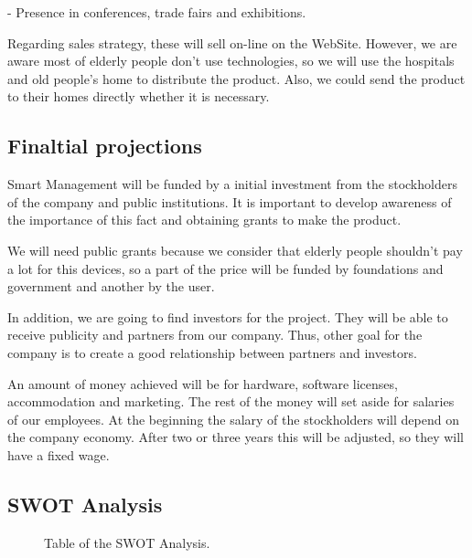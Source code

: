 -	Presence in conferences, trade fairs and exhibitions.

Regarding sales strategy, these will sell on-line on the WebSite. However, we are aware  most of elderly people don’t use technologies, so we will use the hospitals and old people’s home to distribute the product. Also, we could send the product to their homes directly whether it is necessary.


\subsection{Finaltial projections}
Smart Management will be funded by a initial investment from the stockholders of the company and public institutions. It is important to develop awareness of the importance of this fact and obtaining grants to make the product.

We will need public grants because we consider that elderly people shouldn't pay a lot for this devices, so a part of the price will be funded by foundations and government and another by the user.

In addition, we are going to find investors for the project. They will be able to receive publicity and partners from our company. Thus, other goal for the company is to create a good relationship between partners and investors.

An amount of money achieved will be for hardware, software licenses, accommodation and marketing. The rest of the money will set aside for salaries of our employees. At the beginning the salary of the stockholders will depend on the company economy. After two or three years this will be adjusted, so they will have a fixed wage.


\subsection{SWOT Analysis}
\begin{figure}[H]
	\centering
	\caption{Table of the SWOT Analysis.}
	\label{fig:SWOT}
\end{figure}


